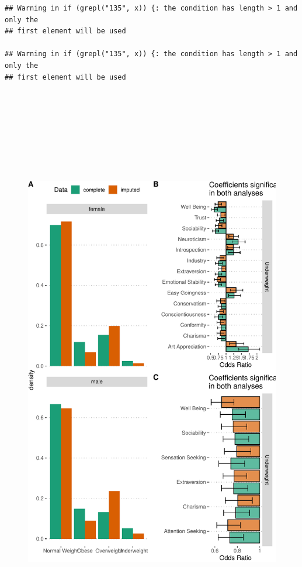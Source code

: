 \documentclass[man]{apa6}
\begin{document}
\begin{verbatim}
## Warning in if (grepl("135", x)) {: the condition has length > 1 and only the
## first element will be used

## Warning in if (grepl("135", x)) {: the condition has length > 1 and only the
## first element will be used
\end{verbatim}

\begin{figure}
\includegraphics[height=10in]{bmi_personality_files/figure-latex/sens-1} \caption{ }\label{fig:sens}
\end{figure}
\end{document}
